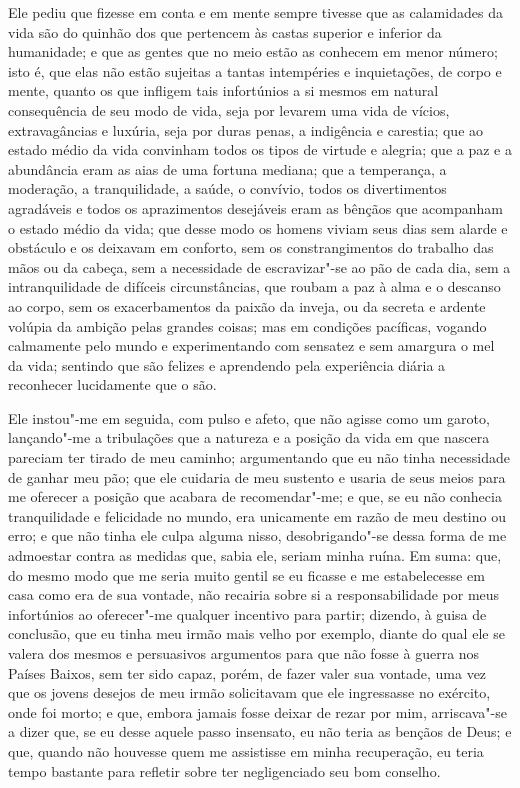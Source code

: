 Ele pediu que fizesse em conta e em mente sempre tivesse que as
calamidades da vida são do quinhão dos que pertencem às castas superior
e inferior da humanidade; e que as gentes que no meio estão as conhecem
em menor número; isto é, que elas não estão sujeitas a tantas
intempéries e inquietações, de corpo e mente, quanto os que infligem
tais infortúnios a si mesmos em natural consequência de seu modo de
vida, seja por levarem uma vida de vícios, extravagâncias e luxúria,
seja por duras penas, a indigência e carestia; que ao estado médio da
vida convinham todos os tipos de virtude e alegria; que a paz e a
abundância eram as aias de uma fortuna mediana; que a temperança, a
moderação, a tranquilidade, a saúde, o convívio, todos os divertimentos
agradáveis e todos os aprazimentos desejáveis eram as bênçãos que
acompanham o estado médio da vida; que desse modo os homens viviam seus
dias sem alarde e obstáculo e os deixavam em conforto, sem os
constrangimentos do trabalho das mãos ou da cabeça, sem a necessidade de
escravizar"-se ao pão de cada dia, sem a intranquilidade de difíceis
circunstâncias, que roubam a paz à alma e o descanso ao corpo, sem os
exacerbamentos da paixão da inveja, ou da secreta e ardente volúpia da
ambição pelas grandes coisas; mas em condições pacíficas, vogando
calmamente pelo mundo e experimentando com sensatez e sem amargura o mel
da vida; sentindo que são felizes e aprendendo pela experiência diária a
reconhecer lucidamente que o são.

Ele instou"-me em seguida, com pulso e afeto, que não agisse como um
garoto, lançando"-me a tribulações que a natureza e a posição da vida em
que nascera pareciam ter tirado de meu caminho; argumentando que eu não
tinha necessidade de ganhar meu pão; que ele cuidaria de meu sustento e
usaria de seus meios para me oferecer a posição que acabara de
recomendar"-me; e que, se eu não conhecia tranquilidade e felicidade no
mundo, era unicamente em razão de meu destino ou erro; e que não tinha
ele culpa alguma nisso, desobrigando"-se dessa forma de me admoestar
contra as medidas que, sabia ele, seriam minha ruína. Em suma: que, do
mesmo modo que me seria muito gentil se eu ficasse e me estabelecesse em
casa como era de sua vontade, não recairia sobre si a responsabilidade
por meus infortúnios ao oferecer"-me qualquer incentivo para partir;
dizendo, à guisa de conclusão, que eu tinha meu irmão mais velho por
exemplo, diante do qual ele se valera dos mesmos e persuasivos
argumentos para que não fosse à guerra nos Países Baixos, sem ter sido
capaz, porém, de fazer valer sua vontade, uma vez que os jovens desejos
de meu irmão solicitavam que ele ingressasse no exército, onde foi
morto; e que, embora jamais fosse deixar de rezar por mim, arriscava"-se
a dizer que, se eu desse aquele passo insensato, eu não teria as bençãos
de Deus; e que, quando não houvesse quem me assistisse em minha
recuperação, eu teria tempo bastante para refletir sobre ter
negligenciado seu bom conselho.

